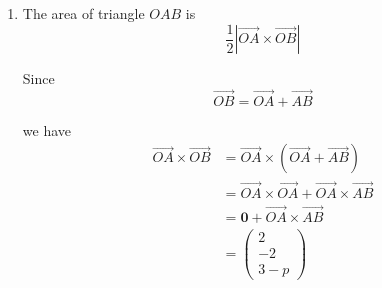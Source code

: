 \documentclass[leqno]{article}
\begin{document}
\begin{enumerate}[
  label=\textbf{\arabic*.},
  leftmargin=*,
  topsep=0pt,
  partopsep=0pt,
  parsep=0pt
]
\begin{djsSolution}
\begin{enumerate}[label=\textbf{(\alph*)}]
  Now calculate the vector product:
  \begin{align*}
  \overrightarrow{OA}\times \overrightarrow{AB}
  &=
  \begin{vmatrix}
  \mathbf{i}&\mathbf{j}&\mathbf{k}\\
  1&1&0\\
  p-1&2&2
  \end{vmatrix} \\
  &=\mathbf{i}(1\times 2-0\times 2)-\mathbf{j}(1\times 2-0\times (p-1))+\mathbf{k}(1\times 2-1\times (p-1)) \\
  &=\begin{pmatrix}2\\-2\\3-p\end{pmatrix}
  \end{align*}

  For this to be parallel to \(\begin{pmatrix}2\\-2\\1\end{pmatrix}\), we must have
  \[
  \begin{pmatrix}2\\-2\\3-p\end{pmatrix}
  =\lambda \begin{pmatrix}2\\-2\\1\end{pmatrix}
  \]

  Comparing first components:
  \[
  2=2\lambda\quad\Longrightarrow\quad\lambda=1
  \]

  Then comparing third components:
  \[
  3-p=1
  \]

  So
  \[
  p=2
  \]

  \item
  The area of triangle \(OAB\) is
  \[
  \frac12\left|\overrightarrow{OA}\times \overrightarrow{OB}\right|
  \]

  Since
  \[
  \overrightarrow{OB}=\overrightarrow{OA}+\overrightarrow{AB}
  \]

  we have
  \begin{align*}
  \overrightarrow{OA}\times \overrightarrow{OB}
  &=\overrightarrow{OA}\times (\overrightarrow{OA}+\overrightarrow{AB}) \\
  &=\overrightarrow{OA}\times \overrightarrow{OA}+\overrightarrow{OA}\times \overrightarrow{AB} \\
  &=\mathbf{0}+\overrightarrow{OA}\times \overrightarrow{AB} \\
  &=\begin{pmatrix}2\\-2\\3-p\end{pmatrix}
  \end{align*}


\end{enumerate}
\end{djsSolution}
\end{enumerate}
\end{document}
